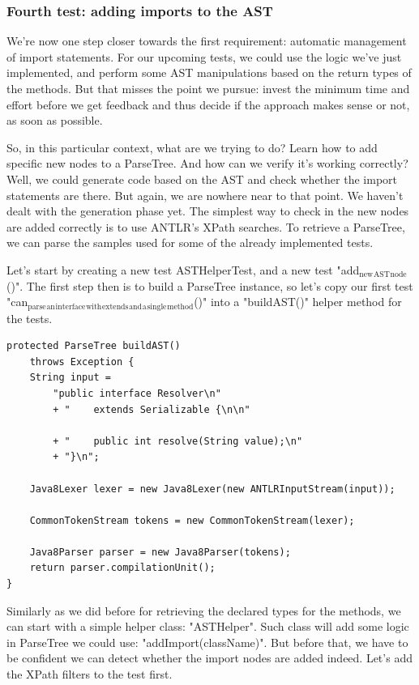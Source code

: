 \documentclass[11pt]{article}
\begin{document}
\subsubsection{Fourth test: adding imports to the AST}
\label{sec-1-3-4}

We're now one step closer towards the first requirement: automatic management of import statements.
For our upcoming tests, we could use the logic we've just implemented, and perform some AST manipulations
based on the return types of the methods. But that misses the point we pursue: invest the minimum time and effort
before we get feedback and thus decide if the approach makes sense or not, as soon as possible.

So, in this particular context, what are we trying to do? Learn how to add specific new nodes to a ParseTree. And how
can we verify it's working correctly? Well, we could generate code based on the AST and check whether the import statements
are there. But again, we are nowhere near to that point. We haven't dealt with the generation phase yet.
The simplest way to check in the new nodes are added correctly is to use ANTLR's XPath searches. To retrieve a ParseTree, we
can parse the samples used for some of the already implemented tests.

Let's start by creating a new test ASTHelperTest, and a new test "add$_{\text{new}}$$_{\text{AST}}$$_{\text{node}}$()". The first step then is to
build a ParseTree instance, so let's copy our first test "can$_{\text{parse}}$$_{\text{an}}$$_{\text{interface}}$$_{\text{with}}$$_{\text{extends}}$$_{\text{and}}$$_{\text{a}}$$_{\text{single}}$$_{\text{method}}$()" into 
a "buildAST()" helper method for the tests.

\begin{verbatim}
protected ParseTree buildAST()
    throws Exception {
    String input =
        "public interface Resolver\n"
        + "    extends Serializable {\n\n"

        + "    public int resolve(String value);\n"
        + "}\n";

    Java8Lexer lexer = new Java8Lexer(new ANTLRInputStream(input));

    CommonTokenStream tokens = new CommonTokenStream(lexer);

    Java8Parser parser = new Java8Parser(tokens);
    return parser.compilationUnit();
}
\end{verbatim}

Similarly as we did before for retrieving the declared types for the methods, we can start with a simple helper class: "ASTHelper".
Such class will add some logic in ParseTree we could use: "addImport(className)". But before that, we have to be confident
we can detect whether the import nodes are added indeed. Let's add the XPath filters to the test first.
\end{document}
